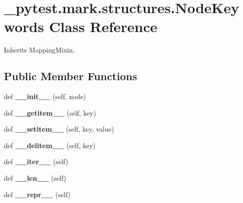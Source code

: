 \hypertarget{class__pytest_1_1mark_1_1structures_1_1_node_keywords}{}\section{\+\_\+pytest.\+mark.\+structures.\+Node\+Keywords Class Reference}
\label{class__pytest_1_1mark_1_1structures_1_1_node_keywords}


Inherits Mapping\+Mixin.

\subsection*{Public Member Functions}
\begin{DoxyCompactItemize}
\item 
\mbox{\label{class__pytest_1_1mark_1_1structures_1_1_node_keywords_acddb413c3c8221f68ee6ab785d6e3d33}} 
def {\bfseries \+\_\+\+\_\+init\+\_\+\+\_\+} (self, node)
\item 
\mbox{\label{class__pytest_1_1mark_1_1structures_1_1_node_keywords_ab7f2c16be24f03592733c4053d43cb21}} 
def {\bfseries \+\_\+\+\_\+getitem\+\_\+\+\_\+} (self, key)
\item 
\mbox{\label{class__pytest_1_1mark_1_1structures_1_1_node_keywords_ae3f93cabaab12e62c653fd76b1f34606}} 
def {\bfseries \+\_\+\+\_\+setitem\+\_\+\+\_\+} (self, key, value)
\item 
\mbox{\label{class__pytest_1_1mark_1_1structures_1_1_node_keywords_ae98348432a1781a22b68fa7426e04dab}} 
def {\bfseries \+\_\+\+\_\+delitem\+\_\+\+\_\+} (self, key)
\item 
\mbox{\label{class__pytest_1_1mark_1_1structures_1_1_node_keywords_a3e67b38640d751d0bdee22a2f219da2b}} 
def {\bfseries \+\_\+\+\_\+iter\+\_\+\+\_\+} (self)
\item 
\mbox{\label{class__pytest_1_1mark_1_1structures_1_1_node_keywords_a49c7fd9da8faf26969352d3003367fd0}} 
def {\bfseries \+\_\+\+\_\+len\+\_\+\+\_\+} (self)
\item 
\mbox{\label{class__pytest_1_1mark_1_1structures_1_1_node_keywords_ab1b9bbcb63b7203cc8af4d97d484b7f6}} 
def {\bfseries \+\_\+\+\_\+repr\+\_\+\+\_\+} (self)
\end{DoxyCompactItemize}
